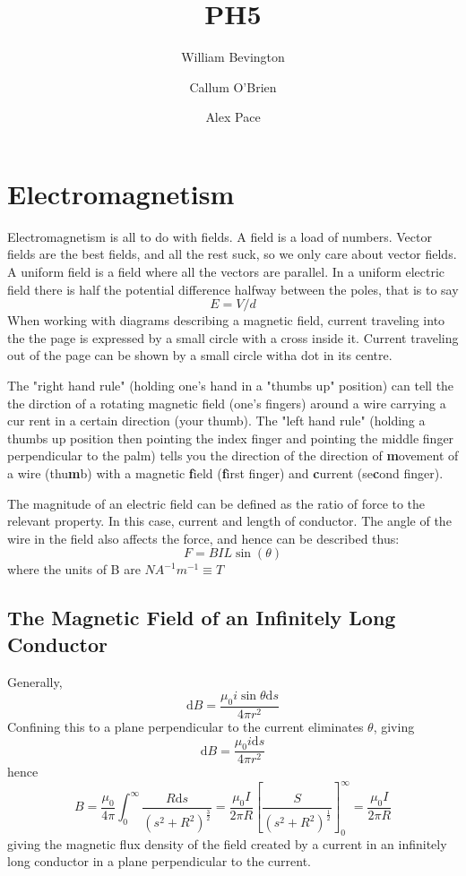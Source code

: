 \documentclass{article}
\title{PH5}
\author{William Bevington \and Callum O'Brien \and Alex Pace}
\begin{document}
\maketitle
\tableofcontents
\newpage

\section{Electromagnetism}

Electromagnetism is all to do with fields. A field is a load of numbers. Vector
fields are the best fields, and all the rest suck, so we only care about vector
fields. A uniform field is a field where all the vectors are parallel. In a
uniform electric field there is half the potential difference halfway between
the poles, that is to say \[E=V/d\] When working with diagrams describing a
magnetic field, current traveling into the the page is expressed by a small
circle with a cross inside it. Current traveling out of the page can be shown by
a small circle witha dot in its centre.

The "right hand rule" (holding one's hand in a "thumbs up" position) can tell
the the dirction of a rotating magnetic field (one's fingers) around a wire
carrying a cur rent in a certain direction (your thumb). The "left hand rule"
(holding a thumbs up position then pointing the index finger and pointing the
middle finger perpendicular to the palm) tells you the direction of the
direction of \textbf{m}ovement of a wire (thu\textbf{m}b) with a magnetic
\textbf{f}ield (\textbf{f}irst finger) and \textbf{c}urrent (se\textbf{c}ond
finger).

The magnitude of an electric field can be defined as the ratio of force to the
relevant property. In this case, current and length of conductor. The angle of
the wire in the field also affects the force, and hence can be described thus:
\[F=BIL\sin\left(\theta\right)\] where the units of B are \(NA^{-1}m^{-1} \equiv
T\)

\subsection{The Magnetic Field of an Infinitely Long Conductor}

Generally, \[\textrm{d}B = \frac{\mu_0 i \sin\theta \textrm{d}s}{4\pi r^2}\]
Confining this to a plane perpendicular to the current eliminates $\theta$,
giving \[\textrm{d}B = \frac{\mu_0 i \textrm{d}s}{4\pi r^2}\] hence
\[B=\frac{\mu_0}{4\pi}\int_0^\infty\frac{R \textrm{d}s}{\left(s^2 +
R^2\right)^{\frac{3}{2}}}=\frac{\mu_0 I}{2\pi R}\left[\frac{S}{\left(s^2 +
R^2\right)^{\frac{1}{2}}}\right]_0^\infty=\frac{\mu_0 I}{2\pi R}\] giving the
magnetic flux density of the field created by a current in an infinitely long
conductor in a plane perpendicular to the current.
\end{document}

